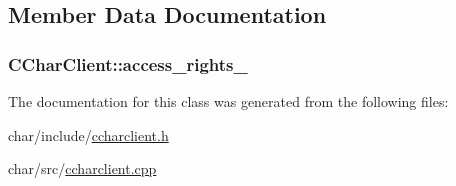 \subsection{Member Data Documentation}
\subsubsection[{\texorpdfstring{access\+\_\+rights\+\_\+}{access_rights_}}]{ C\+Char\+Client\+::access\+\_\+rights\+\_\+\hspace{0.3cm}{\ttfamily [protected]}}\hypertarget{classCCharClient_a7ba9ed7830f1222806e482f4fefee34b}{}\label{classCCharClient_a7ba9ed7830f1222806e482f4fefee34b}


The documentation for this class was generated from the following files\+:\begin{DoxyCompactItemize}
\item 
char/include/\hyperlink{ccharclient_8h}{ccharclient.\+h}\item 
char/src/\hyperlink{ccharclient_8cpp}{ccharclient.\+cpp}\end{DoxyCompactItemize}
